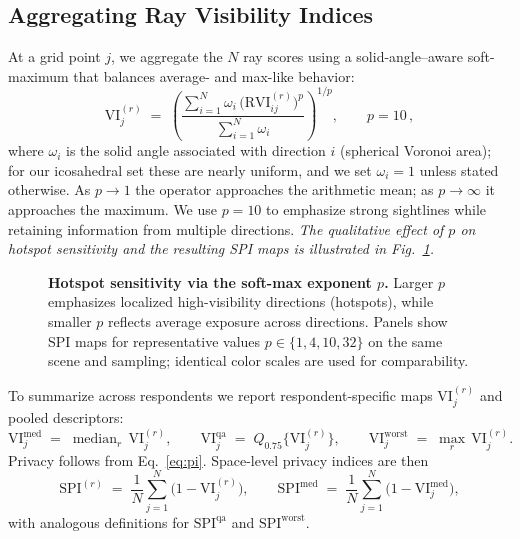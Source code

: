 \documentclass[final,3p,times,review]{elsarticle}
\begin{document}
\subsection{Aggregating Ray Visibility Indices}
\label{sec:aggregation}
At a grid point $j$, we aggregate the $N$ ray scores using a solid-angle–aware soft-maximum that balances average- and max-like behavior:
\begin{equation}
\mathrm{VI}_j^{(r)} \;=\; \left(
\frac{\sum_{i=1}^{N} \omega_i \,\big(\mathrm{RVI}^{(r)}_{ij}\big)^{p}}
     {\sum_{i=1}^{N} \omega_i}
\right)^{\!1/p}, \qquad p=10\,,
\label{eq:softmax-weighted}
\end{equation}
where $\omega_i$ is the solid angle associated with direction $i$ (spherical Voronoi area); for our icosahedral set these are nearly uniform, and we set $\omega_i{=}1$ unless stated otherwise. As $p\!\to\!1$ the operator approaches the arithmetic mean; as $p\!\to\!\infty$ it approaches the maximum. We use $p{=}10$ to emphasize strong sightlines while retaining information from multiple directions.
\textit{The qualitative effect of $p$ on hotspot sensitivity and the resulting SPI maps is illustrated in Fig.~\ref{fig:softmax}.}

\begin{figure}[t]
  \centering
  \caption{\textbf{Hotspot sensitivity via the soft-max exponent $p$.} Larger $p$ emphasizes localized high-visibility directions (hotspots), while smaller $p$ reflects average exposure across directions. Panels show SPI maps for representative values $p\in\{1,4,10,32\}$ on the same scene and sampling; identical color scales are used for comparability.}
  \label{fig:softmax}
\end{figure}

To summarize across respondents we report respondent-specific maps $\mathrm{VI}_j^{(r)}$ and pooled descriptors:
\begin{equation}
\mathrm{VI}_j^{\mathrm{med}} \;=\; \operatorname{median}_{r}\,\mathrm{VI}_j^{(r)},\qquad
\mathrm{VI}_j^{\mathrm{qa}} \;=\; Q_{0.75}\{\mathrm{VI}_j^{(r)}\},\qquad
\mathrm{VI}_j^{\mathrm{worst}} \;=\; \max_{r}\,\mathrm{VI}_j^{(r)}.
\label{eq:acrossrespondents}
\end{equation}
Privacy follows from Eq.~\eqref{eq:pi}. Space-level privacy indices are then
\begin{equation}
\mathrm{SPI}^{(r)} \;=\; \frac{1}{N}\sum_{j=1}^{N}\!\big(1-\mathrm{VI}_j^{(r)}\big),\qquad
\mathrm{SPI}^{\mathrm{med}} \;=\; \frac{1}{N}\sum_{j=1}^{N}\!\big(1-\mathrm{VI}_j^{\mathrm{med}}\big),
\label{eq:spi_respondent_pooled}
\end{equation}
with analogous definitions for $\mathrm{SPI}^{\mathrm{qa}}$ and $\mathrm{SPI}^{\mathrm{worst}}$.
\end{document}
